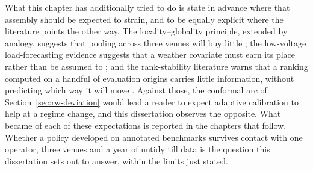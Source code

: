 What this chapter has additionally tried to do is state in advance where that
assembly should be expected to strain, and to be equally explicit where the
literature points the other way. The locality--globality principle, extended by
analogy, suggests that pooling across three venues will buy little
\citep{montero-manso_principles_2021}; the low-voltage load-forecasting evidence
suggests that a weather covariate must earn its place rather than be assumed to
\citep{haben_short_2019,hertel_explainable_2026}; and the rank-stability
literature warns that a ranking computed on a handful of evaluation origins
carries little information, without predicting which way it will move
\citep{hewamalage_look_2021,brigato_there_2025}. Against those, the conformal
arc of Section~\ref{sec:rw-deviation} would lead a reader to expect adaptive
calibration to help at a regime change, and this dissertation observes the
opposite. What became of each of these expectations is reported in the chapters
that follow. Whether a policy developed on annotated benchmarks survives
contact with one operator, three venues and a year of untidy till data is the
question this dissertation sets out to answer, within the limits just stated.
